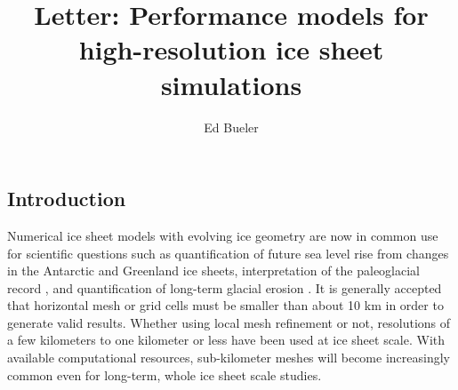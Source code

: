 \documentclass[twocolumn,letterpaper]{igs}
\begin{document}
\title[Performance models for high-resolution ice sheet simulations]{Letter: Performance models for \\ high-resolution ice sheet simulations}


\author{Ed Bueler}



\maketitle

\sectionsize

\subsection{Introduction}

Numerical ice sheet models with evolving ice geometry are now in common use for scientific questions such as quantification of future sea level rise from changes in the Antarctic \citep{Seroussietal2020} and Greenland \citep{Goelzeretal2020} ice sheets, interpretation of the paleoglacial record \citep{Weberetal2021}, and quantification of long-term glacial erosion \citep{SeguinotDelaney2021}.  It is generally accepted that horizontal mesh or grid cells must be smaller than about 10 km in order to generate valid results.  Whether using local mesh refinement \citep[for example]{Hoffmanetal2018} or not, resolutions of a few kilometers to one kilometer \citep{SeguinotDelaney2021} or less \citep{Aschwandenetal2019} have been used at ice sheet scale.  With available computational resources, sub-kilometer meshes will become increasingly common even for long-term, whole ice sheet scale studies.
\end{document}
